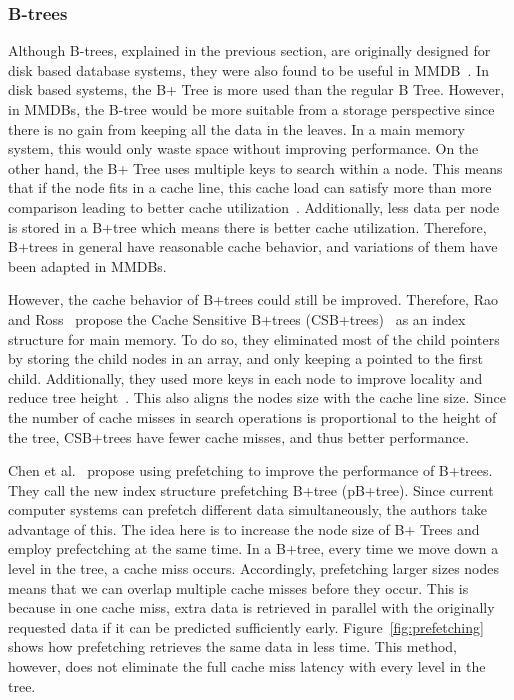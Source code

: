 \documentclass[12pt,a4paper]{article}
\begin{document}
\subsubsection*{B-trees}
Although B-trees, explained in the previous section, are originally designed for disk based database systems, they were also found to be useful in
MMDB~\cite{lehman1986study}. In disk based systems, the B+ Tree is more used than the regular B Tree. However, in MMDBs, the B-tree would be
more suitable from a storage perspective since there is no gain from keeping all the data in the leaves. In a main memory system, this
would only waste space without improving performance. On the other hand, the B+ Tree uses multiple keys to search within a node. This means that
if the node fits in a cache line, this cache load can satisfy more than more comparison leading to better cache utilization~\cite{rao1999cache}. Additionally,
less data per node is stored in a B+tree which means there is better cache utilization. Therefore, B+trees in general have reasonable cache behavior, and
variations of them have been adapted in MMDBs.

However, the cache behavior of B+trees could still be improved. Therefore, Rao and Ross~\cite{rao2000making} propose the Cache Sensitive B+trees
(CSB+trees)~\cite{rao2000making} as an index structure for main memory. To do so, they eliminated most of the child pointers by storing the child nodes
in an array, and only keeping a pointed to the first child. Additionally, they used more keys in each
node to improve locality and reduce tree height~\cite{luan2009prefetching}. This also aligns the nodes size with the cache line size. Since the number of cache
misses in search operations is proportional to the height
of the tree, CSB+trees have fewer cache misses, and thus better performance.

Chen et al.~\cite{chen2001improving} propose using prefetching to improve the performance of B+trees. They call the new index structure prefetching B+tree
(pB+tree). Since current computer systems can prefetch different data simultaneously, the authors take advantage of this. The idea here is to increase the node
size of B+ Trees and employ prefectching at the same time. In a B+tree, every time we move down a level in the tree, a cache miss occurs. Accordingly,
prefetching larger sizes nodes means that we can overlap multiple cache misses before they occur. This is because in one cache miss, extra data is retrieved in
parallel with the originally requested data if it can be predicted sufficiently early. Figure~\ref{fig:prefetching} shows how prefetching retrieves the same
data in less time. This method, however, does not eliminate the full cache miss latency with every level in the tree.
\end{document}
